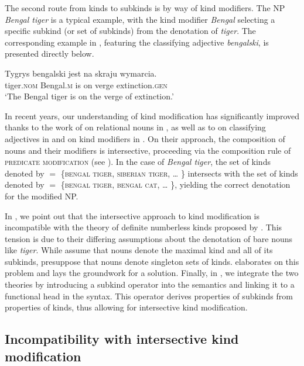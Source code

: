 \documentclass[output=paper]{langscibook}
\begin{document}
\noindent
The second route from kinds to subkinds is by way of kind modifiers. The NP \textit{Bengal tiger} is a typical example, with the kind modifier \textit{Bengal} selecting a specific subkind (or set of subkinds) from the denotation of \textit{tiger}. The corresponding example in , featuring the classifying adjective \textit{bengalski}, is presented directly below.

\ea \label{ex:subkind_2} \gll
Tygrys bengalski jest na skraju wymarcia.\\
tiger.\textsc{nom} Bengal.\textsc{m} is on verge extinction.\textsc{gen}\\
\glt `The Bengal tiger is on the verge of extinction.'
\z

\noindent
In recent years, our understanding of kind modification has significantly improved thanks to the work of \citet{McNally.Boleda2004} on relational nouns in , as well as to \citet{Wagiel2014} on classifying adjectives in  and \citet{Borik.Espinal2015} on kind modifiers in . On their approach, the composition of nouns and their modifiers is intersective, proceeding via the composition rule of \textsc{predicate modification} (see \citealt{Heim.Kratzer1998}). In the case of \textit{Bengal tiger}, the set of kinds denoted by  $=$ \{\textsc{bengal tiger}, \textsc{siberian tiger}, {\dots} \} intersects with the set of kinds denoted by   $=$ \{\textsc{bengal tiger}, \textsc{bengal cat}, {\dots} \}, yielding the correct denotation for the modified NP.

In , we point out that the intersective approach to kind modification is incompatible with the theory of definite numberless kinds proposed by \citet{Borik.Espinal2012, Borik.Espinal2015}. This tension is due to their differing assumptions about the denotation of bare nouns like \textit{tiger}. While \citet{McNally.Boleda2004} assume that nouns denote the maximal kind and all of its subkinds, \citet{Borik.Espinal2012} presuppose that nouns denote singleton sets of kinds.  elaborates on this problem and lays the groundwork for a solution. Finally, in , we integrate the two theories by introducing a subkind operator into the semantics and linking it to a functional head in the syntax. This operator derives properties of subkinds from properties of kinds, thus allowing for intersective kind modification.


\subsection{Incompatibility with intersective kind modification}
\label{sec:problem-intersec}
\end{document}
